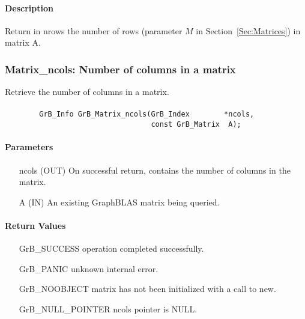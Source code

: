 \paragraph{Description}

Return in {\sf nrows} the number of rows (parameter $M$ in Section~\ref{Sec:Matrices}) in matrix {\sf A}.

\subsubsection{{\sf Matrix\_ncols}: Number of columns in a matrix}

Retrieve the number of columns in a matrix.

\paragraph{\syntax}

\begin{verbatim}
        GrB_Info GrB_Matrix_ncols(GrB_Index        *ncols,
                                  const GrB_Matrix  A);
\end{verbatim}

\paragraph{Parameters}

\begin{itemize}[leftmargin=1.1in]
    \item[{\sf ncols}] ({\sf OUT}) On successful return, contains the number of columns in the matrix.
    \item[{\sf A}] ({\sf IN}) An existing GraphBLAS matrix being queried.
\end{itemize}

\paragraph{Return Values}

\begin{itemize}[leftmargin=2.1in]
\item[{\sf GrB\_SUCCESS}]   operation completed successfully.
\item[{\sf GrB\_PANIC}]     unknown internal error.
\item[{\sf GrB\_NOOBJECT}]  matrix has not been initialized with a call to {\sf new}.
\item[{\sf GrB\_NULL\_POINTER}]    {\sf ncols} pointer is {\sf NULL}.
\end{itemize}

